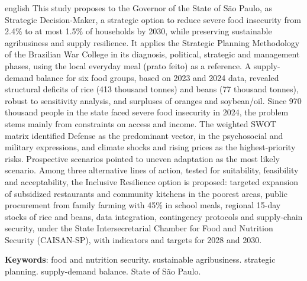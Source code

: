 \documentclass[
	12pt,				%
	openright,			%
	oneside,			%
	a4paper,			%
	chapter=TITLE,		%
	section=TITLE,		%
	english,			%
	french,				%
	spanish,			%
	brazil,				%
 ]{abntex2}
\begin{document}
\begin{resumo}[Abstract]
\begin{otherlanguage*}{english}
This study proposes to the Governor of the State of São Paulo, as Strategic
Decision-Maker, a strategic option to reduce severe food insecurity from 2.4\%
to at most 1.5\% of households by 2030, while preserving sustainable
agribusiness and supply resilience. It applies the Strategic Planning
Methodology of the Brazilian War College in its diagnosis, political, strategic
and management phases, using the local everyday meal (prato feito) as a
reference. A supply-demand balance for six food groups, based on 2023 and 2024
data, revealed structural deficits of rice (413 thousand tonnes) and beans (77
thousand tonnes), robust to sensitivity analysis, and surpluses of oranges and
soybean/oil. Since 970 thousand people in the state faced severe food insecurity
in 2024, the problem stems mainly from constraints on access and income. The
weighted SWOT matrix identified Defense as the predominant vector, in the
psychosocial and military expressions, and climate shocks and rising prices as
the highest-priority risks. Prospective scenarios pointed to uneven adaptation as
the most likely scenario. Among three alternative lines of action, tested for
suitability, feasibility and acceptability, the Inclusive Resilience option is
proposed: targeted expansion of subsidized restaurants and community kitchens in
the poorest areas, public procurement from family farming with 45\% in school
meals, regional 15-day stocks of rice and beans, data integration, contingency
protocols and supply-chain security, under the State Intersecretarial Chamber
for Food and Nutrition Security (CAISAN-SP), with
indicators and targets for 2028 and 2030.

\noindent
\textbf{Keywords}: food and nutrition security. sustainable agribusiness.
strategic planning. supply-demand balance. State of São Paulo.
\end{otherlanguage*}
\end{resumo}

\listoffigures*
\cleardoublepage

\listoftables*
\cleardoublepage

\makeatletter
{}
\begingroup\setlength{\parskip}{\z@}
\def\l@quadro#1#2{\begingroup\def\numberline##1{Quadro~##1\ \textendash\ }\l@table{#1}{#2}\endgroup}
\endgroup
\makeatother
\cleardoublepage
\end{document}
